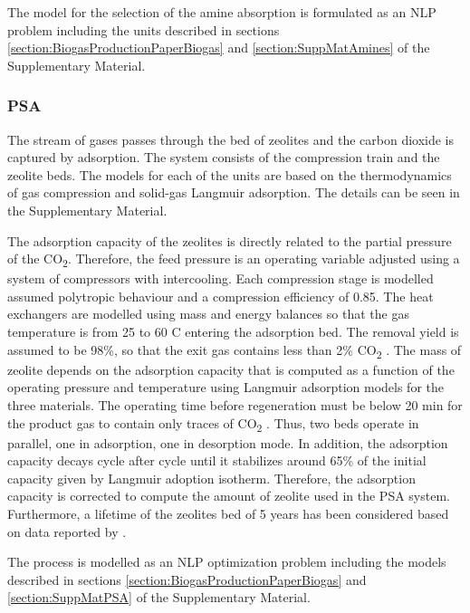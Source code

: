 \begin{refsection}[referencesCh7]
The model for the selection of the amine absorption is formulated as an NLP problem including the units described in sections \ref{section:BiogasProductionPaperBiogas} and \ref{section:SuppMatAmines} of the Supplementary Material.

\subsubsection{PSA} \label{section:MathModPSA}
The stream of gases passes through the bed of zeolites and the carbon dioxide is captured by adsorption. The system consists of the compression train and the zeolite beds. The models for each of
the units are based on the thermodynamics of gas compression and solid-gas Langmuir adsorption. The details can be seen in the Supplementary Material.

The adsorption capacity of the zeolites is directly related to the partial pressure of the CO\textsubscript{2}. Therefore, the feed pressure is an operating variable adjusted using a system of compressors with intercooling. Each compression stage is modelled assumed polytropic behaviour and a compression efficiency of 0.85. The heat exchangers are modelled using mass and energy balances so that the gas temperature is from 25 to 60 \textdegree C entering the adsorption bed. The removal yield is assumed to be 98\%, so that the exit gas contains less than 2\% CO\textsubscript{2} \citep{ferella2017separation}. The mass of zeolite depends on the adsorption capacity that is computed as a function of the operating pressure and temperature using Langmuir adsorption models for the three materials. The operating time before regeneration must be below 20 min for the product gas to contain only traces of CO\textsubscript{2} \citep{hauchhum2014carbon}. Thus, two beds operate in parallel, one in adsorption, one in desorption mode. In addition, the adsorption capacity decays cycle after cycle until it stabilizes around 65\% of the initial capacity given by Langmuir adoption isotherm. Therefore, the adsorption capacity is corrected to compute the amount of zeolite used in the PSA system. Furthermore, a lifetime of the zeolites bed of 5 years has been considered based on data reported by \citep{Xiao2013}.

The process is modelled as an NLP optimization problem including the models described in sections \ref{section:BiogasProductionPaperBiogas} and \ref{section:SuppMatPSA} of the Supplementary Material.


\end{refsection}
